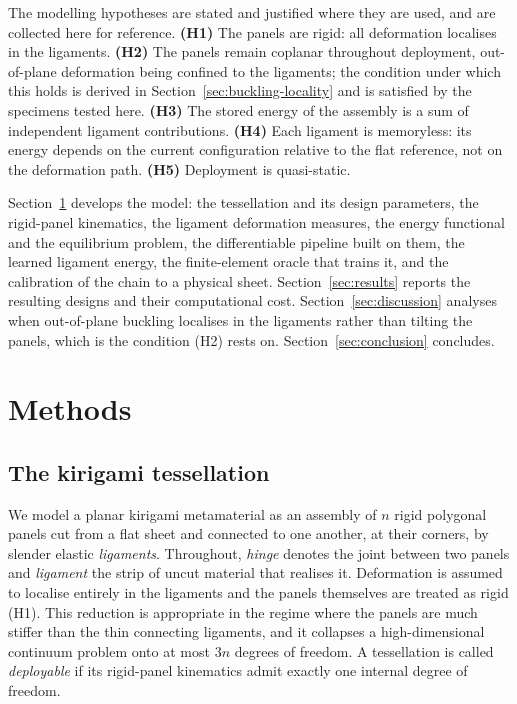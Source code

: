 \documentclass[pdflatex,sn-mathphys-num]{sn-jnl}%
\theoremstyle{thmstyleone}%
\theoremstyle{thmstyletwo}%
\theoremstyle{thmstylethree}%
\begin{document}
The modelling hypotheses are stated and justified where they are used, and are
collected here for reference. \textbf{(H1)} The panels are rigid: all deformation
localises in the ligaments. \textbf{(H2)} The panels remain coplanar throughout
deployment, out-of-plane deformation being confined to the ligaments; the
condition under which this holds is derived in Section~\ref{sec:buckling-locality}
and is satisfied by the specimens tested here. \textbf{(H3)} The stored energy of
the assembly is a sum of independent ligament contributions. \textbf{(H4)} Each
ligament is memoryless: its energy depends on the current configuration relative
to the flat reference, not on the deformation path. \textbf{(H5)} Deployment is
quasi-static.

Section~\ref{sec:methods} develops the model: the tessellation and its design
parameters, the rigid-panel kinematics, the ligament deformation measures, the
energy functional and the equilibrium problem, the differentiable pipeline built
on them, the learned ligament energy, the finite-element oracle that trains it,
and the calibration of the chain to a physical sheet.
Section~\ref{sec:results} reports the resulting designs and their computational
cost. Section~\ref{sec:discussion} analyses when out-of-plane buckling localises
in the ligaments rather than tilting the panels, which is the condition (H2) rests
on. Section~\ref{sec:conclusion} concludes.

\section{Methods}\label{sec:methods}

\subsection{The kirigami tessellation}

We model a planar kirigami metamaterial as an assembly of $n$ rigid polygonal
panels cut from a flat sheet and connected to one another, at their corners, by
slender elastic \emph{ligaments}. Throughout, \emph{hinge} denotes the joint
between two panels and \emph{ligament} the strip of uncut material that realises
it. Deformation is assumed to localise entirely in the ligaments and the panels
themselves are treated as rigid (H1). This reduction is appropriate in the regime
where the panels are much stiffer than the thin connecting ligaments, and it
collapses a high-dimensional continuum problem onto at most $3n$ degrees of
freedom. A tessellation is called \emph{deployable} if its rigid-panel kinematics
admit exactly one internal degree of freedom.
\end{document}
